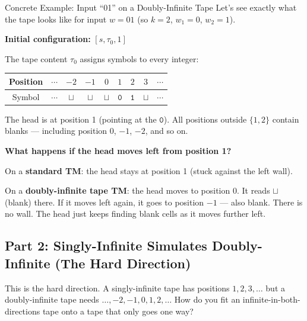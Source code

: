 \begin{examplebox}{Concrete Example: Input ``01'' on a Doubly-Infinite Tape}
Let's see exactly what the tape looks like for input $w = 01$ (so $k = 2$,
$w_1 = 0$, $w_2 = 1$).

\textbf{Initial configuration:} $[s, \tau_0, 1]$

The tape content $\tau_0$ assigns symbols to every integer:
\begin{center}
\begin{tabular}{c|cccccccc}
Position & $\cdots$ & $-2$ & $-1$ & $0$ & $1$ & $2$ & $3$ & $\cdots$ \\
\hline
Symbol & $\cdots$ & $\sqcup$ & $\sqcup$ & $\sqcup$ & $\mathtt{0}$ & $\mathtt{1}$ & $\sqcup$ & $\cdots$ \\
\end{tabular}
\end{center}

The head is at position 1 (pointing at the $\mathtt{0}$). All positions outside
$\{1, 2\}$ contain blanks --- including position 0, $-1$, $-2$, and so on.

\textbf{What happens if the head moves left from position 1?}

On a \textbf{standard TM}: the head stays at position 1 (stuck against the
left wall).

On a \textbf{doubly-infinite tape TM}: the head moves to position 0. It reads
$\sqcup$ (blank) there. If it moves left again, it goes to position $-1$ ---
also blank. There is no wall. The head just keeps finding blank cells as it
moves further left.

\end{examplebox}


\subsection{Part 2: Singly-Infinite Simulates Doubly-Infinite (The Hard Direction)}
\label{subsec:singly-simulates-doubly}

This is the hard direction. A singly-infinite tape has positions $1, 2, 3,
\ldots$ but a doubly-infinite tape needs $\ldots, -2, -1, 0, 1, 2, \ldots$
How do you fit an infinite-in-both-directions tape onto a tape that only goes
one way?

